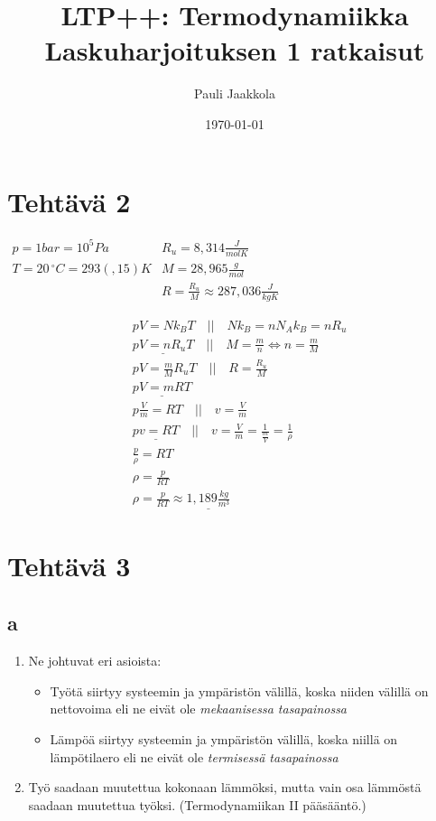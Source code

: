 \documentclass[12pt,a4paper,finnish]{article}
\title{LTP++: Termodynamiikka\\Laskuharjoituksen 1 ratkaisut}
\date{\today}
\author{Pauli Jaakkola}
\begin{document}
\maketitle
\tableofcontents
\newpage

\section{Tehtävä 2}

\begin{math}
\begin{array}{ll}
 p = 1bar = 10^5 Pa & R_u = 8,314 \frac{J}{molK}\\
 T = 20\,^{\circ}C = 293(,15)K & M = 28,965 \frac{g}{mol}\\
 & R = \frac{R_u}{M} \approx 287,036 \frac{J}{kgK}
\end{array}
\end{math}

\begin{align}
 &pV = Nk_BT \quad\bigg|\bigg|\quad Nk_B = nN_Ak_B = nR_u\\
 &\underline{pV = nR_uT} \quad\bigg|\bigg|\quad M = \frac{m}{n} \Leftrightarrow n = \frac{m}{M}\\
 &pV = \frac{m}{M}R_uT \quad\bigg|\bigg|\quad R = \frac{R_u}{M}\\
 &\underline{pV = mRT}\\
 &p\frac{V}{m} = RT \quad\bigg|\bigg|\quad v = \frac{V}{m}\\
 &\underline{pv = RT} \quad\bigg|\bigg|\quad v = \frac{V}{m} = \frac{1}{\frac{m}{V}} = \frac{1}{\rho}\\
 &\frac{p}{\rho} = RT\\
 &\rho = \frac{p}{RT}\\
 &\rho = \frac{p}{RT} \approx \underline{1,189 \frac{kg}{m^3}}
\end{align}

\section{Tehtävä 3}

\subsection{a}
\begin{enumerate}
 \item Ne johtuvat eri asioista:
 \begin{itemize}
  \item Työtä siirtyy systeemin ja ympäristön välillä, koska niiden välillä on nettovoima
    eli ne eivät ole \textit{mekaanisessa tasapainossa}
  \item Lämpöä siirtyy systeemin ja ympäristön välillä, koska niillä on lämpötilaero
    eli ne eivät ole \textit{termisessä tasapainossa}
 \end{itemize}
 \item Työ saadaan muutettua kokonaan lämmöksi, mutta vain osa lämmöstä saadaan muutettua työksi.
  (Termodynamiikan II pääsääntö.)
\end{enumerate}
\end{document}
